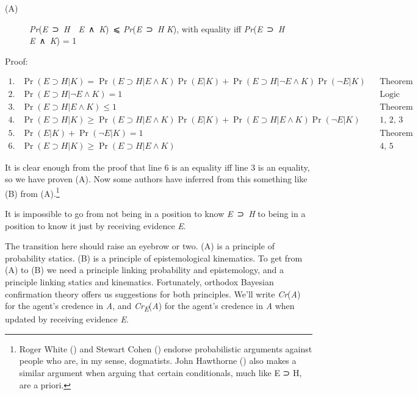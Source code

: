\documentclass[
  10pt,
  letterpaper,
  DIV=11,
  numbers=noendperiod,
  twoside]{scrartcl}
\providecommand{\tightlist}{%
  \setlength{\itemsep}{0pt}\setlength{\parskip}{0pt}}\usepackage{longtable,booktabs,array}
\begin{document}
\begin{description}
\item[(A)]
\emph{Pr}(\emph{E}~⊃~\emph{H}~\textbar~\emph{E}~∧~\emph{K})~⩽
\emph{Pr}(\emph{E}~⊃~\emph{H} \textbar{} \emph{K}), with equality iff
\emph{Pr}(\emph{E}~⊃~\emph{H} \textbar{} \emph{E}~∧~\emph{K}) = 1
\end{description}

Proof:

\begin{figure*}

\[
\begin{aligned}
1. & \Pr(E \supset H | K) = \Pr(E \supset H | E \wedge K)\Pr(E | K) + \Pr(E \supset H | \neg E \wedge K)\Pr(\neg E | K) &&  \text{Theorem} \\
2. & \Pr(E \supset H | \neg E \wedge K) = 1 && \text{Logic} \\
3. & \Pr(E \supset H | E \wedge K) \leq 1  && \text{Theorem} \\
4. & \Pr(E \supset H | K)  \geq \Pr(E \supset H | E \wedge K)\Pr(E | K) + \Pr(E \supset H | E \wedge K)\Pr(\neg E | K)  && \text{1, 2, 3} \\
5. & \Pr(E | K) + \Pr(\neg E | K) = 1  && \text{Theorem} \\
6. & \Pr(E \supset H | K) \geq \Pr(E \supset H | E \wedge K) && \text{4, 5}
\end{aligned}
\]

\end{figure*}%

\noindent It is clear enough from the proof that line 6 is an equality
iff line 3 is an equality, so we have proven (A). Now some authors have
inferred from this something like (B) from (A).\footnote{Roger White
  () and Stewart Cohen
  () endorse probabilistic arguments
  against people who are, in my sense, dogmatists. John Hawthorne
  () also makes a similar argument
  when arguing that certain conditionals, much like E ⊃ H, are a priori.}

\begin{description}
\tightlist
\item[(B)]
It is impossible to go from not being in a position to know
\emph{E}~⊃~\emph{H} to being in a position to know it just by receiving
evidence \emph{E}.
\end{description}

The transition here should raise an eyebrow or two. (A) is a principle
of probability statics. (B) is a principle of epistemological
kinematics. To get from (A) to (B) we need a principle linking
probability and epistemology, and a principle linking statics and
kinematics. Fortunately, orthodox Bayesian confirmation theory offers us
suggestions for both principles. We'll write \emph{Cr}(\emph{A}) for the
agent's credence in \emph{A}, and \emph{Cr\textsubscript{E}}(\emph{A})
for the agent's credence in \emph{A} when updated by receiving evidence
\emph{E}.
\end{document}
